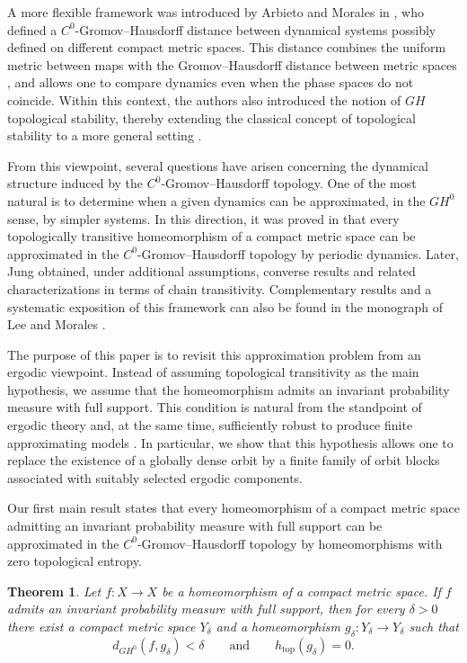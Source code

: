 \documentclass{amsart}
\numberwithin{equation}{section}
\newtheorem{theorem}{Theorem}[section]
\theoremstyle{remark}
\DeclareMathOperator{\topo}{top}
\begin{document}
A more flexible framework was introduced by Arbieto and Morales in \cite{arbieto2017topological}, who defined a $C^0$-Gromov--Hausdorff distance between dynamical systems possibly defined on different compact metric spaces. This distance combines the uniform metric between maps with the Gromov--Hausdorff distance between metric spaces \cite{gromov2007,burago2001}, and allows one to compare dynamics even when the phase spaces do not coincide. Within this context, the authors also introduced the notion of $GH$ topological stability, thereby extending the classical concept of topological stability to a more general setting \cite{arbieto2017topological}.

From this viewpoint, several questions have arisen concerning the dynamical structure induced by the $C^0$-Gromov--Hausdorff topology. One of the most natural is to determine when a given dynamics can be approximated, in the $GH^0$ sense, by simpler systems. In this direction, it was proved in \cite{cubas2018propriedades} that every topologically transitive homeomorphism of a compact metric space can be approximated in the $C^0$-Gromov--Hausdorff topology by periodic dynamics. Later, Jung \cite{jung2019closure} obtained, under additional assumptions, converse results and related characterizations in terms of chain transitivity. Complementary results and a systematic exposition of this framework can also be found in the monograph of Lee and Morales \cite{lee2022gromov}.

The purpose of this paper is to revisit this approximation problem from an ergodic viewpoint. Instead of assuming topological transitivity as the main hypothesis, we assume that the homeomorphism admits an invariant probability measure with full support. This condition is natural from the standpoint of ergodic theory and, at the same time, sufficiently robust to produce finite approximating models \cite{walters1982,viana2016foundations}. In particular, we show that this hypothesis allows one to replace the existence of a globally dense orbit by a finite family of orbit blocks associated with suitably selected ergodic components.

Our first main result states that every homeomorphism of a compact metric space admitting an invariant probability measure with full support can be approximated in the $C^0$-Gromov--Hausdorff topology by homeomorphisms with zero topological entropy.

\begin{theorem}
Let $f:X\to X$ be a homeomorphism of a compact metric space. If $f$ admits an invariant probability measure with full support, then for every $\delta>0$ there exist a compact metric space $Y_\delta$ and a homeomorphism $g_\delta:Y_\delta\to Y_\delta$ such that
\[
d_{GH^0}(f,g_\delta)<\delta
\qquad\text{and}\qquad
h_{\topo}(g_\delta)=0.
\]
\end{theorem}
\end{document}
